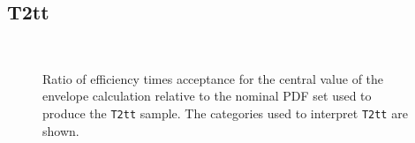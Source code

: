 \clearpage
\subsection{T2tt\label{app:t2tt}}

%
\begin{figure}[h!]
  \begin{center}
    \\
    \caption{\label{fig:sms-pdf-t2tt}Ratio of efficiency times
      acceptance for the central value of the envelope calculation relative 
      to the nominal PDF set used to produce the \texttt{T2tt} sample. The categories
      used to interpret \texttt{T2tt} are shown.}
  \end{center}
\end{figure}

